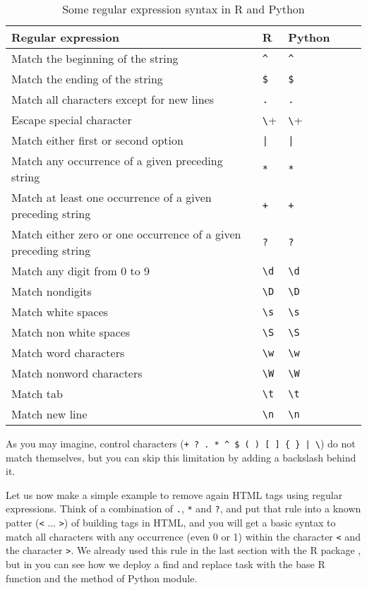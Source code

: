 \begin{table}
  \caption{\label{tab:regex}Some regular expression syntax in R and Python}{
  \begin{tabularx}{\textwidth}{lllll}
    \toprule
Regular expression      & R   & Python\\ \midrule
Match the beginning of the string	& \verb+^+ & \verb+^+  \\
Match the ending	 of the string   & \verb+$+ & \verb+$+ \\
Match all characters except for new lines   & \verb+.+ & \verb+.+ 	\\ 
Escape special character  & \verb+\+ & \verb+\+     \\ 
Match either first or second option  & \verb+|+ & \verb+|+     \\ 
Match any occurrence of a given preceding string & \verb+*+ & \verb+*+ \\ 
Match at least one occurrence of a given preceding string & \verb|+| & \verb|+| \\ 
Match either zero or one occurrence of a given preceding string & \verb|?| & \verb|?| \\ 
Match any digit from 0 to 9	& \verb+\d+ & \verb+\d+  \\
Match nondigits	& \verb+\D+ & \verb+\D+  \\
Match white spaces	& \verb+\s+ & \verb+\s	+  \\
Match non white spaces	& \verb+\S+ & \verb+\S	+  \\
Match word characters	 & \verb+\w+ & \verb+\w+  \\
Match nonword characters	& \verb+\W+ & \verb+\W+  \\
Match tab	& \verb+\t+ & \verb+\t	+  \\
Match new line	& \verb+\n+ & \verb+\n		+  \\
    \bottomrule
  \end{tabularx}}{}
\end{table}


As you may imagine, control characters (\verb!+ ? . * ^ $ ( ) [ ] { } | \!) do not match themselves, but you can skip this limitation by adding a backslash behind it.

Let us now make a simple example to remove again HTML tags using regular expressions. Think of a combination of \verb+.+, \verb+*+ and \verb+?+, and put that rule into a known patter (\verb+<+ ... \verb+>+) of building tags in HTML, and you will get a basic syntax to match all characters with any occurrence (even 0 or 1) within the character \verb+<+ and the character \verb+>+. We already used this rule in the last section with the R package , but in  you can see how we deploy a find and replace task with the base R function  and the method  of Python  module.		


